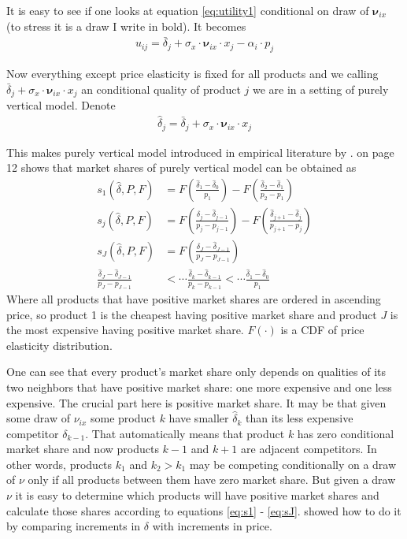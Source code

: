 \documentclass[12pt,letterpaper]{article}
\begin{document}
	It is easy to see if one looks at equation \ref{eq:utility1} conditional on draw of $\boldsymbol\nu_{ix}$ (to stress it is a draw I write in bold). It becomes
	\begin{align}
	u_{ij} = {\bar \delta_j} + \sigma_x \cdot \boldsymbol{\nu}_{ix} \cdot x_j - \alpha_i\cdot p_j
	\label{eq:utility}
	\end{align}
	
	Now everything except price elasticity is fixed for all products and we  calling ${\bar \delta_j} + \sigma_x \cdot \boldsymbol{\nu}_{ix} \cdot x_j$ an conditional quality of product $j$ we are in a setting of \cite{bresnahan1990entry} purely vertical model. Denote 
	\begin{align}
	\hat \delta_j = {\bar \delta_j} + \sigma_x \cdot \boldsymbol{\nu}_{ix} \cdot x_j
	\label{eq:delta}
	\end{align}
	
	This makes purely vertical model introduced in empirical literature by \cite{bresnahan1990entry}. \cite{song2007measuring} on page 12 shows that market shares of purely vertical model can be obtained as
	\begin{align}
	s_1(\hat \delta, P,F) &= F\left(\frac{\hat\delta_1 - \hat\delta_0}{p_1}\right) - F\left(\frac{\hat\delta_2 - \hat\delta_1}{p_2 - p_1}\right)\label{eq:s1}\\	
	s_j(\hat \delta, P,F) &= F\left(\frac{\hat\delta_j - \hat\delta_{j-1}}{p_j - p_{j-1}}\right) - F\left(\frac{\hat\delta_{j+1} - \hat\delta_{j}}{p_{j+1} - p_{j}}\right)\label{eq:sk}\\	
	s_J(\hat \delta, P,F) &= F\left(\frac{\hat\delta_J - \hat\delta_{J-1}}{p_J - p_{J-1}}\right)\label{eq:sJ}\\
	\frac{\hat\delta_J - \hat\delta_{J-1}}{p_J - p_{J-1}} &<\cdots \frac{\hat\delta_k - \hat\delta_{k-1}}{p_k - p_{k-1}}<\cdots\frac{\hat\delta_1 - \hat\delta_{0}}{p_1}
	\end{align}
	Where all products that have positive market shares are ordered in ascending price, so product 1 is the cheapest having positive market share and product $J$ is the most expensive having positive market share. $F(\cdot)$ is a CDF of price elasticity distribution.  
	
	One can see that every product's market share only depends on qualities of its two neighbors that have positive market share: one more expensive and one less expensive. The crucial part here is positive market share. It may be that given some draw of $\nu_{ix}$ some product $k$ have smaller $\hat \delta_k$ than its less expensive competitor $\delta_{k-1}$. That automatically means that product $k$ has zero conditional market share and now products $k-1$ and $k+1$ are adjacent competitors. In other words, products $k_1$ and $k_2>k_1$ may be competing conditionally on a draw of $\nu$ only if all products between them have zero market share. But given a draw $\nu$ it is easy to determine which products will have positive market shares and calculate those shares according to equations \ref{eq:s1} - \ref{eq:sJ}. \cite{berry2007pure} showed how to do it by comparing increments in $\delta$ with increments in price.
	
\end{document}
